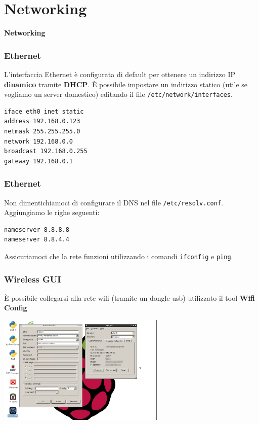 \documentclass[xcolor=svgnames,11pt]{beamer}
\begin{document}
\section{Networking}
\begin{frame}{}
\begin{center}
\begin{Huge}
{\color{green_raspi} \textbf{Networking}}
\end{Huge}
\end{center}
\end{frame}

\begin{frame}[fragile]\frametitle{Ethernet}
L'interfaccia Ethernet \`e configurata di default per ottenere un indirizzo IP \textbf{dinamico} tramite \textbf{DHCP}.
\medskip
\`E possibile impostare un indirizzo statico (utile se vogliamo un server domestico) editando il file \texttt{/etc/network/interfaces}.
\begin{verbatim}
iface eth0 inet static
address 192.168.0.123
netmask 255.255.255.0
network 192.168.0.0
broadcast 192.168.0.255
gateway 192.168.0.1
\end{verbatim}
\end{frame}

\begin{frame}[fragile]\frametitle{Ethernet}
Non dimentichiamoci di configurare il DNS nel file \texttt{/etc/resolv.conf}. Aggiungiamo le righe seguenti:
\begin{verbatim}
nameserver 8.8.8.8
nameserver 8.8.4.4
\end{verbatim}

\medskip
Assicuriamoci che la rete funzioni utilizzando i comandi \texttt{ifconfig} e \texttt{ping}.
\end{frame}

\begin{frame}\frametitle{Wireless GUI}
\`E possibile collegarsi alla rete wifi (tramite un dongle usb) utilizzato il tool \textbf{Wifi Config}
\medskip
\begin{center}
\includegraphics[width=8cm]{wpa-gui.png}
\end{center}
\end{frame}
\end{document}
